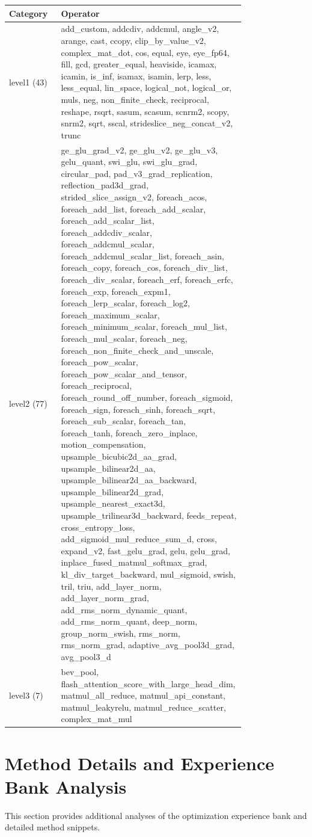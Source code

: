 \documentclass{article}
\theoremstyle{plain}
\theoremstyle{definition}
\theoremstyle{remark}
\begin{document}
\begin{tabular}{@{}l p{0.78\linewidth}@{}}
\hline
\textbf{Category} & \textbf{Operator} \\
\hline
level1 (43) &  add\_custom, addcdiv, addcmul, angle\_v2, arange, cast, ccopy, clip\_by\_value\_v2, complex\_mat\_dot, cos, equal, eye, eye\_fp64, fill, gcd, greater\_equal, heaviside, icamax, icamin, is\_inf, isamax, isamin, lerp, less, less\_equal, lin\_space, logical\_not, logical\_or, muls, neg, non\_finite\_check, reciprocal, reshape, rsqrt, sasum, scasum, scnrm2, scopy, snrm2, sqrt, sscal, strideslice\_neg\_concat\_v2, trunc \\
level2 (77) & ge\_glu\_grad\_v2, ge\_glu\_v2, ge\_glu\_v3, gelu\_quant, swi\_glu, swi\_glu\_grad, circular\_pad, pad\_v3\_grad\_replication, reflection\_pad3d\_grad, strided\_slice\_assign\_v2, foreach\_acos, foreach\_add\_list, foreach\_add\_scalar, foreach\_add\_scalar\_list, foreach\_addcdiv\_scalar, foreach\_addcmul\_scalar, foreach\_addcmul\_scalar\_list, foreach\_asin, foreach\_copy, foreach\_cos, foreach\_div\_list, foreach\_div\_scalar, foreach\_erf, foreach\_erfc, foreach\_exp, foreach\_expm1, foreach\_lerp\_scalar, foreach\_log2, foreach\_maximum\_scalar, foreach\_minimum\_scalar, foreach\_mul\_list, foreach\_mul\_scalar, foreach\_neg, foreach\_non\_finite\_check\_and\_unscale, foreach\_pow\_scalar, foreach\_pow\_scalar\_and\_tensor, foreach\_reciprocal, foreach\_round\_off\_number, foreach\_sigmoid, foreach\_sign, foreach\_sinh, foreach\_sqrt, foreach\_sub\_scalar, foreach\_tan, foreach\_tanh, foreach\_zero\_inplace, motion\_compensation, upsample\_bicubic2d\_aa\_grad, upsample\_bilinear2d\_aa, upsample\_bilinear2d\_aa\_backward, upsample\_bilinear2d\_grad, upsample\_nearest\_exact3d, upsample\_trilinear3d\_backward, feeds\_repeat, cross\_entropy\_loss, add\_sigmoid\_mul\_reduce\_sum\_d, cross, expand\_v2, fast\_gelu\_grad, gelu, gelu\_grad, inplace\_fused\_matmul\_softmax\_grad, kl\_div\_target\_backward, mul\_sigmoid, swish, tril, triu, add\_layer\_norm, add\_layer\_norm\_grad, add\_rms\_norm\_dynamic\_quant, add\_rms\_norm\_quant, deep\_norm, group\_norm\_swish, rms\_norm, rms\_norm\_grad, adaptive\_avg\_pool3d\_grad, avg\_pool3\_d \\
level3 (7) & bev\_pool, flash\_attention\_score\_with\_large\_head\_dim, matmul\_all\_reduce, matmul\_api\_constant, matmul\_leakyrelu, matmul\_reduce\_scatter, complex\_mat\_mul \\
\hline
\end{tabular}

\section{Method Details and Experience Bank Analysis}
\label{app:method_experience}
This section provides additional analyses of the optimization experience bank and detailed method snippets.
\end{document}
